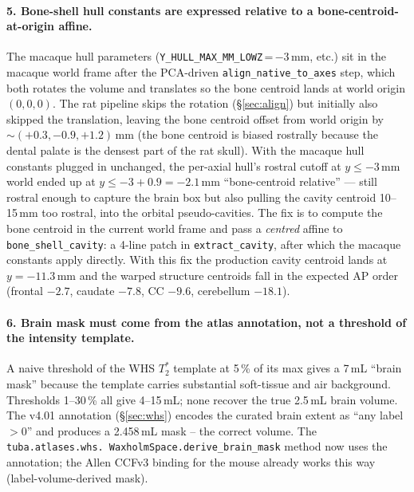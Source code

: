 \documentclass{compactarticle}
\begin{document}
\paragraph{5. Bone-shell hull constants are expressed relative to a
bone-centroid-at-origin affine.} The macaque hull parameters
(\texttt{Y\_HULL\_MAX\_MM\_LOWZ}\,=\,$-3$\,mm, etc.) sit in the
macaque world frame after the PCA-driven
\texttt{align\_native\_to\_axes} step, which both rotates the volume
and translates so the bone centroid lands at world origin
$(0,0,0)$. The rat pipeline skips the rotation (\S\ref{sec:align})
but initially also skipped the translation, leaving the bone
centroid offset from world origin by ${\sim}(+0.3, -0.9, +1.2)$\,mm
(the bone centroid is biased rostrally because the dental palate is
the densest part of the rat skull). With the macaque hull constants
plugged in unchanged, the per-axial hull's rostral cutoff at
$y\le-3$\,mm world ended up at $y\le-3+0.9=-2.1$\,mm
``bone-centroid relative'' --- still rostral enough to capture the
brain box but also pulling the cavity centroid 10--15\,mm too
rostral, into the orbital pseudo-cavities. The fix is to compute
the bone centroid in the current world frame and pass a
\emph{centred} affine to
\texttt{bone\_shell\_cavity}: a 4-line patch in
\texttt{extract\_cavity}, after which the macaque constants apply
directly. With this fix the production cavity centroid lands at
$y=-11.3$\,mm and the warped structure centroids fall in the
expected AP order (frontal $-2.7$, caudate $-7.8$, CC $-9.6$,
cerebellum $-18.1$).

\paragraph{6. Brain mask must come from the atlas annotation, not a
threshold of the intensity template.} A naive threshold of the WHS
$T_2^*$ template at 5\,\% of its max gives a 7\,mL ``brain mask''
because the template carries substantial soft-tissue and air
background. Thresholds 1--30\,\% all give 4--15\,mL; none recover
the true 2.5\,mL brain volume. The v4.01 annotation
(\S\ref{sec:whs}) encodes the curated brain extent as
``any label $>0$'' and produces a 2.458\,mL mask -- the correct
volume. The \texttt{tuba.atlases.\allowbreak whs.\allowbreak
WaxholmSpace.\allowbreak derive\_brain\_mask} method now uses the
annotation; the Allen CCFv3 binding for the mouse already works
this way (label-volume-derived mask).

\end{document}
